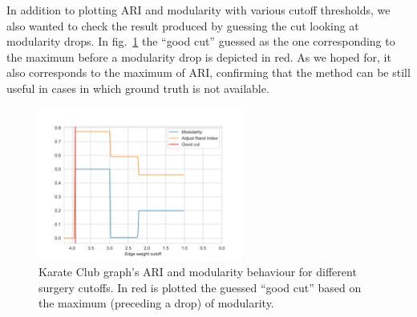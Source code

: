 In addition to plotting ARI and modularity with various cutoff thresholds, we also wanted to check the result produced by guessing the cut looking at modularity drops. In fig.~\ref{fig:Karate_Accuracy} the “good cut” guessed as the one corresponding to the maximum before a modularity drop is depicted in red. As we hoped for, it also corresponds to the maximum of ARI, confirming that the method can be still useful in cases in which ground truth is not available.
\begin{figure}
    \centering
    \includegraphics[width=0.6\textwidth]{../KarateClubResults/Surgery Accuracy.png}
    \caption{Karate Club graph's ARI and modularity behaviour for different surgery cutoffs. In red is plotted the guessed “good cut” based on the maximum (preceding a drop) of modularity.}
    \label{fig:Karate_Accuracy}
\end{figure}


